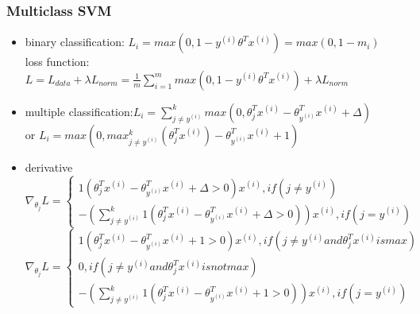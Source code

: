 \begin{frame}
\frametitle{Multiclass SVM}
	\small
	\begin{itemize}
		\item binary classification: $L_i=max(0,1-y^{(i)}\theta^Tx^{(i)})=max(0,1-m_i)$
		\\loss function: $L=L_{data}+\lambda L_{norm}=\frac{1}{m}\sum_{i=1}^{m}max(0,1-y^{(i)}\theta^Tx^{(i)})+\lambda L_{norm}$
		\item multiple classification:$L_i=\sum_{j\neq y^{(i)}}^{k}
										max(0,
											\theta_j^Tx^{(i)}-
											\theta_{y^{(i)}}^Tx^{(i)}+
											\Delta)$
		\\\hspace{3cm}or $L_i=			max(0,
											max_{j\neq y^{(i)}}^{k}(
											\theta_j^Tx^{(i)})-
											\theta_{y^{(i)}}^Tx^{(i)}+
											1)$
		\item derivative\\
\footnotesize
				\begin{equation}
					\nabla_{\theta_j} L=
					\left\{
						\begin{aligned}
							1(
								\theta_j^Tx^{(i)}
								-\theta_{y^{(i)}}^Tx^{(i)}
								+\Delta > 0
							)x^{(i)}, if(j\neq y^{(i)})\\
							-(
								\sum_{j\neq y^{(i)}}^k
									1(
										\theta_j^Tx^{(i)}
										-\theta_{y^{(i)}}^Tx^{(i)}
										+\Delta > 0
									)
							)x^{(i)}, if(j= y^{(i)})
						\end{aligned}
					\right.
				\end{equation}
				\begin{equation}
					\nabla_{\theta_j} L=
					\left\{
						\begin{aligned}
							1(
										\theta_j^Tx^{(i)}-
										\theta_{y^{(i)}}^Tx^{(i)}+
										1 > 0
							)x^{(i)}, 
								if(j\neq y^{(i)} and \theta_j^Tx^{(i)} is max)\\
							0, if(j\neq y^{(i)} and \theta_j^Tx^{(i)} is not max)\\
							-(
								\sum_{j\neq y^{(i)}}^k
									1(
											\theta_j^Tx^{(i)}-
											\theta_{y^{(i)}}^Tx^{(i)}+
											1 > 0
									)
							)x^{(i)}, if(j= y^{(i)})
						\end{aligned}
					\right.
				\end{equation}
	\end{itemize}
\end{frame}
\ifx\allfiles\undefined

\fi
